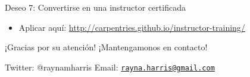 \documentclass[ignorenonframetext,]{beamer}
\providecommand{\tightlist}{%
  \setlength{\itemsep}{0pt}\setlength{\parskip}{0pt}}
\begin{document}
\begin{frame}{Deseo 7: Convertirse en una instructor certificada}

\begin{itemize}[<+->]
\tightlist
\item
  Aplicar aquí: \url{http://carpentries.github.io/instructor-training/}
\end{itemize}

\end{frame}

\begin{frame}{¡Gracias por su atención! ¡Mantengamonos en contacto!}

Twitter: @raynamharris Email:
\href{mailto:rayna.harris@gmail.com}{\nolinkurl{rayna.harris@gmail.com}}

\end{frame}
\end{document}
